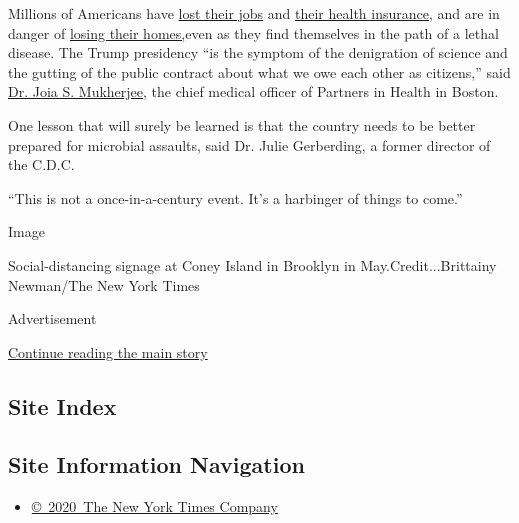 Millions of Americans have
\href{https://www.nytimes3xbfgragh.onion/live/2020/07/23/business/stock-market-today-coronavirus\#roughly-one-in-five-workers-are-collecting-unemployment-benefits}{lost
their jobs} and
\href{https://www.nytimes3xbfgragh.onion/2020/07/13/us/politics/coronavirus-health-insurance-trump.html}{their
health insurance}, and are in danger of
\href{https://www.nytimes3xbfgragh.onion/2020/07/23/opinion/coronavirus-evictions-rent.html}{losing
their homes,}even as they find themselves in the path of a lethal
disease. The Trump presidency ``is the symptom of the denigration of
science and the gutting of the public contract about what we owe each
other as citizens,'' said
\href{https://ghsm.hms.harvard.edu/faculty-staff/joia-stapleton-mukherjee}{Dr.
Joia S. Mukherjee}, the chief medical officer of Partners in Health in
Boston.

One lesson that will surely be learned is that the country needs to be
better prepared for microbial assaults, said Dr. Julie Gerberding, a
former director of the C.D.C.

``This is not a once-in-a-century event. It's a harbinger of things to
come.''

Image

Social-distancing signage at Coney Island in Brooklyn in
May.Credit...Brittainy Newman/The New York Times

Advertisement

\protect\hyperlink{after-bottom}{Continue reading the main story}

\hypertarget{site-index}{%
\subsection{Site Index}\label{site-index}}

\hypertarget{site-information-navigation}{%
\subsection{Site Information
Navigation}\label{site-information-navigation}}

\begin{itemize}
\tightlist
\item
  \href{https://help.nytimes3xbfgragh.onion/hc/en-us/articles/115014792127-Copyright-notice}{©~2020~The
  New York Times Company}
\end{itemize}

